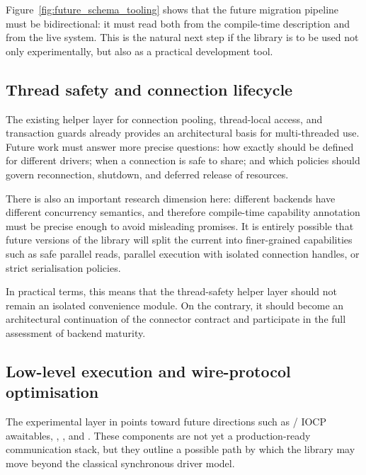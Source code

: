 Figure~\ref{fig:future_schema_tooling} shows that the future migration pipeline must be bidirectional: it must read both from the compile-time description and from the live system. This is the natural next step if the library is to be used not only experimentally, but also as a practical development tool.

\subsection{Thread safety and connection lifecycle}

The existing helper layer for connection pooling, thread-local access, and transaction guards already provides an architectural basis for multi-threaded use. Future work must answer more precise questions: how exactly  should be defined for different drivers; when a connection is safe to share; and which policies should govern reconnection, shutdown, and deferred release of resources.

There is also an important research dimension here: different backends have different concurrency semantics, and therefore compile-time capability annotation must be precise enough to avoid misleading promises. It is entirely possible that future versions of the library will split the current  into finer-grained capabilities such as safe parallel reads, parallel execution with isolated connection handles, or strict serialisation policies.

In practical terms, this means that the thread-safety helper layer should not remain an isolated convenience module. On the contrary, it should become an architectural continuation of the connector contract and participate in the full assessment of backend maturity.

\subsection{Low-level execution and wire-protocol optimisation}

The experimental layer in  points toward future directions such as  / IOCP awaitables, , , and . These components are not yet a production-ready communication stack, but they outline a possible path by which the library may move beyond the classical synchronous driver model.


